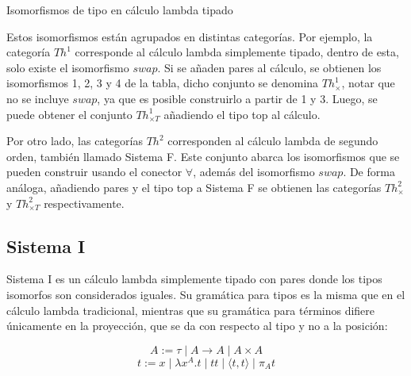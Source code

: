 \begin{table}[H]
\begin{minipage}{0.7\linewidth}
	\end{minipage}
	\caption{Isomorfismos de tipo en cálculo lambda tipado}
\end{table}

Estos isomorfismos están agrupados en distintas categorías.
Por ejemplo, la categoría $Th^1$ corresponde al cálculo lambda simplemente tipado, dentro de esta, solo existe el isomorfismo $swap$.
Si se añaden pares al cálculo, se obtienen los isomorfismos 1, 2, 3 y 4 de la tabla, dicho conjunto se denomina  $Th^1_\times$, notar que no se incluye $swap$, ya que es posible construirlo a partir de 1 y 3.
Luego, se puede obtener el conjunto $Th^1_{\times T}$ añadiendo el tipo top al cálculo.

Por otro lado, las categorías $Th^2$ corresponden al cálculo lambda de segundo orden, también llamado Sistema F.
Este conjunto abarca los isomorfismos que se pueden construir usando el conector $\forall$, además del isomorfismo $swap$.
De forma análoga, añadiendo pares y el tipo top a Sistema F se obtienen las categorías $Th^2_\times$ y $Th^2_{\times T}$ respectivamente.

\subsection{Sistema I}

Sistema I \cite{system-i} es un cálculo lambda simplemente tipado con pares donde los tipos isomorfos son considerados iguales.
Su gramática para tipos es la misma que en el cálculo lambda tradicional, mientras que su gramática para términos difiere únicamente en la proyección, que se da con respecto al tipo y no a la posición:

\[ A := \tau \mid A \rightarrow A \mid A \times A \]
\[ t := x \mid \lambda x^A.t \mid t t \mid \langle t, t \rangle \mid \pi_A t \]

